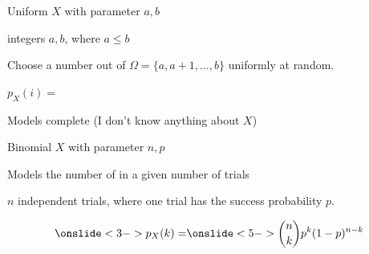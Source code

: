 \begin{frame}{Uniform $X$ with parameter $a,b$}

\plitemsep 0.1in

\bci 
\item integers $a,b$, where $a \le b$

\item<2-> Choose a number out of $\Omega = \{ a, a+1, \ldots, b \}$ uniformly at random. 

\item<3-> $p_X(i) =$ 



\item<5-> Models complete  (I don't know anything about $X$)

\eci 

\end{frame}

\begin{frame}{Binomial $X$ with parameter $n,p$}

{
\plitemsep 0.1in
\bci 
\item<2-> Models the number of  in a given number of  trials
\item<3-> $n$ independent trials, where one trial has the success probability $p.$

$$
\onslide<3->{p_X(k) =} \onslide<5->{{n \choose k} p^k (1-p)^{n-k}}
$$
\eci 
}
{
}
\end{frame}

